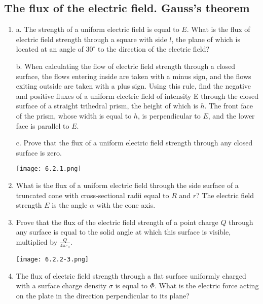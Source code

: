 \documentclass{article}
\begin{document}
\subsection{The flux of the electric field. Gauss's theorem}
\begin{enumerate}[label=6.2.\arabic*]

\item a. The strength of a uniform electric field is equal to $E$. What is the flux of electric field strength through a square with side $l$, the plane of which is located at an angle of $30^\circ$ to the direction of the electric field? 

b. When calculating the flow of electric field strength through a closed surface, the flows entering inside are taken with a minus sign, and the flows exiting outside are taken with a plus sign. Using this rule, find the negative and positive fluxes of a uniform electric field of intensity E through the closed surface of a straight trihedral prism, the height of which is $h$. The front face of the prism, whose width is equal to $h$, is perpendicular to $E$, and the lower face is parallel to $E$. 


c. Prove that the flux of a uniform electric field strength through any closed surface is zero.

\begin{center}
    \texttt{[image: 6.2.1.png]}
\end{center}

\item What is the flux of a uniform electric field through the side surface of a truncated cone with cross-sectional radii equal to $R$ and $r$? The electric field strength $E$ is the angle $\alpha$ with the cone axis.

\item Prove that the flux of the electric field strength of a point charge $Q$ through any surface is equal to the solid angle at which this surface is visible, multiplied by $\frac{Q}{4\pi \varepsilon_0}$.

\begin{center}
    \texttt{[image: 6.2.2-3.png]}
\end{center}

\item The flux of electric field strength through a flat surface uniformly charged with a surface charge density $\sigma$ is equal to $\Phi$. What is the electric force acting on the plate in the direction perpendicular to its plane?


\end{enumerate}
\end{document}
